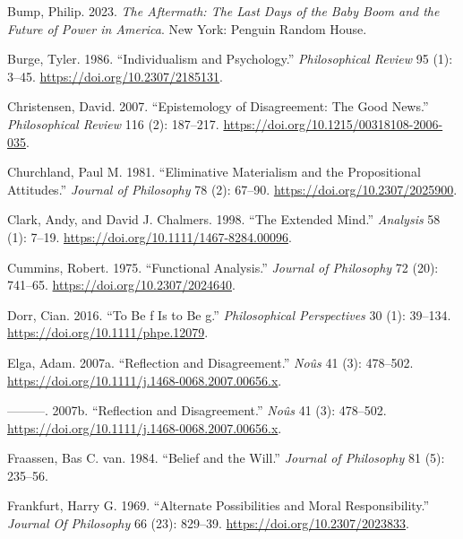 \documentclass[
  12pt,
  letterpaper,
  DIV=11,
  numbers=noendperiod]{scrartcl}
\newlength{\cslhangindent}
\newenvironment{CSLReferences}[2] %
 {\begin{list}{}{%
  \setlength{\itemindent}{0pt}
  \setlength{\leftmargin}{0pt}
  \setlength{\parsep}{0pt}
  \ifodd #1
   \setlength{\leftmargin}{\cslhangindent}
   \setlength{\itemindent}{-1\cslhangindent}
  \fi
  \setlength{\itemsep}{#2\baselineskip}}}
 {\end{list}}
\begin{document}
\label{refs}
\begin{CSLReferences}{1}{0}
Bump, Philip. 2023. \emph{The Aftermath: The Last Days of the Baby Boom
and the Future of Power in America}. New York: Penguin Random House.

Burge, Tyler. 1986. {``Individualism and Psychology.''}
\emph{Philosophical Review} 95 (1): 3--45.
\url{https://doi.org/10.2307/2185131}.

Christensen, David. 2007. {``Epistemology of Disagreement: The Good
News.''} \emph{Philosophical Review} 116 (2): 187--217.
\url{https://doi.org/10.1215/00318108-2006-035}.

Churchland, Paul M. 1981. {``Eliminative Materialism and the
Propositional Attitudes.''} \emph{Journal of Philosophy} 78 (2): 67--90.
\url{https://doi.org/10.2307/2025900}.

Clark, Andy, and David J. Chalmers. 1998. {``The Extended Mind.''}
\emph{Analysis} 58 (1): 7--19.
\url{https://doi.org/10.1111/1467-8284.00096}.

Cummins, Robert. 1975. {``Functional Analysis.''} \emph{Journal of
Philosophy} 72 (20): 741--65. \url{https://doi.org/10.2307/2024640}.

Dorr, Cian. 2016. {``To Be f Is to Be g.''} \emph{Philosophical
Perspectives} 30 (1): 39--134. \url{https://doi.org/10.1111/phpe.12079}.

Elga, Adam. 2007a. {``Reflection and Disagreement.''} \emph{No{û}s} 41
(3): 478--502. \url{https://doi.org/10.1111/j.1468-0068.2007.00656.x}.

---------. 2007b. {``Reflection and Disagreement.''} \emph{Noûs} 41 (3):
478--502. \url{https://doi.org/10.1111/j.1468-0068.2007.00656.x}.

Fraassen, Bas C. van. 1984. {``Belief and the Will.''} \emph{Journal of
Philosophy} 81 (5): 235--56.

Frankfurt, Harry G. 1969. {``Alternate Possibilities and Moral
Responsibility.''} \emph{Journal Of Philosophy} 66 (23): 829--39.
\url{https://doi.org/10.2307/2023833}.


\end{CSLReferences}
\end{document}

